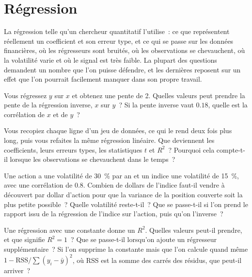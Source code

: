 \chapter{Régression}\label{ch:iv1:regression}

\begin{ivtrains}
La régression telle qu'un chercheur quantitatif l'utilise~: ce que représentent réellement un coefficient et son erreur type, et ce qui se passe
sur les données financières, où les régresseurs sont bruités, où les observations se chevauchent, où la volatilité varie et où le signal est très faible. La plupart des questions demandent
un nombre que l'on puisse défendre, et les dernières reposent sur un effet que l'on pourrait facilement manquer dans son propre travail.
\end{ivtrains}

\begin{question}\label{iq:iv1:regression:1}
Vous régressez $y$ sur $x$ et obtenez une pente de 2. Quelles valeurs peut prendre la pente de la régression inverse, $x$ sur $y$~? Si la pente inverse vaut $0.18$, quelle est la corrélation de $x$ et de $y$~?
\end{question}

\begin{question}\label{iq:iv1:regression:2}
Vous recopiez chaque ligne d'un jeu de données, ce qui le rend deux fois plus long, puis vous refaites la même régression linéaire. Que deviennent les coefficients, leurs erreurs types, les statistiques $t$ et $R^2$~? Pourquoi cela compte-t-il lorsque les observations se chevauchent dans le temps~?
\end{question}

\begin{question}\label{iq:iv1:regression:3}
Une action a une volatilité de 30~\% par an et un indice une volatilité de 15~\%, avec une corrélation de $0.8$. Combien de dollars de l'indice faut-il vendre à découvert par dollar d'action pour que la variance de la position couverte soit la plus petite possible~? Quelle volatilité reste-t-il~? Que se passe-t-il si l'on prend le rapport issu de la régression de l'indice sur l'action, puis qu'on l'inverse~?
\end{question}

\begin{question}\label{iq:iv1:regression:4}
Une régression avec une constante donne un $R^2$. Quelles valeurs peut-il prendre, et que signifie $R^2 = 1$~? Que se passe-t-il lorsqu'on ajoute un régresseur supplémentaire~? Si l'on supprime la constante mais que l'on calcule quand même $1 - \text{RSS}/\sum (y_i - \bar y)^2$, où RSS est la somme des carrés des résidus, que peut-il arriver~?
\end{question}

